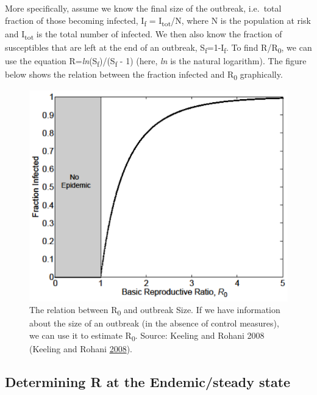 \documentclass[]{article}
\theoremstyle{definition}
\theoremstyle{definition}
\theoremstyle{definition}
\theoremstyle{remark}
\begin{document}
More specifically, assume we know the final size of the outbreak,
i.e.~total fraction of those becoming infected, I\textsubscript{f} =
I\textsubscript{tot}/N, where N is the population at risk and
I\textsubscript{tot} is the total number of infected. We then also know
the fraction of susceptibles that are left at the end of an outbreak,
S\textsubscript{f}=1-I\textsubscript{f}. To find R/R\textsubscript{0},
we can use the equation
R=\emph{ln}(S\textsubscript{f})/(S\textsubscript{f} - 1) (here,
\emph{ln} is the natural logarithm). The figure below shows the relation
between the fraction infected and R\textsubscript{0} graphically.

\begin{figure}
\centering
\includegraphics{./images/outbreaksize.png}
\caption{The relation between R\textsubscript{0} and outbreak Size. If
we have information about the size of an outbreak (in the absence of
control measures), we can use it to estimate R\textsubscript{0}. Source:
Keeling and Rohani 2008 (Keeling and Rohani
\protect\hyperlink{ref-keeling08}{2008}).}
\end{figure}

\subsection{Determining R at the Endemic/steady
state}\label{determining-r-at-the-endemicsteady-state}
\end{document}
